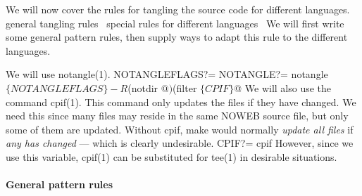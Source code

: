 We will now cover the rules for tangling the source code for different 
languages.
\nwenddocs{}\endmoddef\nwstartdeflinemarkup{}\nwenddeflinemarkup
\LA{}general tangling rules~{\nwtagstyle{}}\RA{}
\LA{}special rules for different languages~{\nwtagstyle{}}\RA{}
\nwendcode{}We will first write some general pattern rules, then supply ways to adapt 
this rule to the different languages.

We will use notangle(1).
\nwenddocs{}\plusendmoddef\nwstartdeflinemarkup{}\nwenddeflinemarkup
NOTANGLEFLAGS?=
NOTANGLE?=      notangle $\{NOTANGLEFLAGS\} -R$(notdir $@) $(filter %
                  $\{CPIF\} $@
\nwendcode{}We will also use the command cpif(1).
This command only updates the files if they have changed.
We need this since many files may reside in the same NOWEB source file, but 
only some of them are updated.
Without {\Tt{}cpif\nwendquote}, make would normally \emph{update all files} if \emph{any has 
changed} --- which is clearly undesirable.
\nwenddocs{}\plusendmoddef\nwstartdeflinemarkup{}\nwenddeflinemarkup
CPIF?=          cpif
\nwendcode{}However, since we use this variable, cpif(1) can be substituted for tee(1) in 
desirable situations.

\paragraph{General pattern rules}

